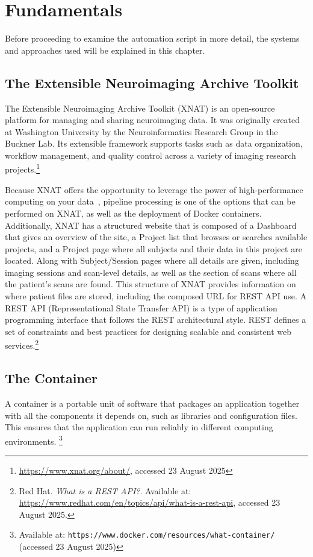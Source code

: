 
\chapter{Fundamentals}

Before proceeding to examine the automation script in more detail, the systems and approaches used will be explained in this chapter.

\section{The Extensible Neuroimaging Archive Toolkit}
The Extensible Neuroimaging Archive Toolkit (XNAT) is an open-source platform for managing and sharing neuroimaging data. It was originally created at Washington University by the Neuroinformatics Research Group in the Buckner Lab. Its extensible framework supports tasks such as data organization, workflow management, and quality control across a variety of imaging research projects.\footnote{\url{https://www.xnat.org/about/}, accessed 23 August 2025}

Because XNAT offers the opportunity to leverage the power of high-performance computing on your data~\cite{zaschke_extending_2024}, 
pipeline processing is one of the options that can be performed on XNAT, as well as the deployment of Docker containers.
\\
Additionally, XNAT has a structured website that is composed of a Dashboard that gives an overview of the site, a Project list that browses or searches available projects, and a Project page where all subjects and their data in this project are located. Along with Subject/Session pages where all details are given, including imaging sessions and scan-level details, as well as the section of scans where all the patient’s scans are found. 
This structure of XNAT provides information on where patient files are stored, including the composed URL for REST API use. A REST API (Representational State Transfer API) is a type of application programming interface that follows the REST architectural style. REST defines a set of constraints and best practices for designing scalable and consistent web services.\footnote{Red Hat. \textit{What is a REST API?}. Available at: \url{https://www.redhat.com/en/topics/api/what-is-a-rest-api}, accessed 23 August 2025.}

\section{The Container} 
A container is a portable unit of software that packages an application together with all the components it depends on, such as libraries and configuration files. This ensures that the application can run reliably in different computing environments. \footnote{Available at: \texttt{https://www.docker.com/resources/what-container/} (accessed 23 August 2025)}

